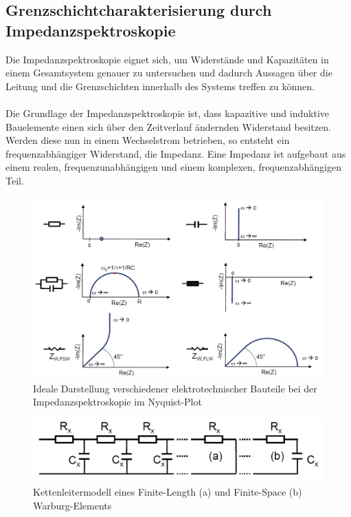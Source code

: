 \documentclass[a4paper, 11pt, headsepline,footsepline,twoside,abstract]{scrbook}
\begin{document}
\subsection{Grenzschichtcharakterisierung durch Impedanzspektroskopie}
Die Impedanzspektroskopie eignet sich, um Widerstände und Kapazitäten in einem Gesamtsystem genauer zu untersuchen und dadurch Aussagen über die Leitung und die Grenzschichten innerhalb des Systems treffen zu können.
\\\\
Die Grundlage der Impedanzspektroskopie ist, dass kapazitive und induktive Bauelemente einen sich über den Zeitverlauf ändernden Widerstand besitzen. Werden diese nun in einem Wechselstrom betrieben, so entsteht ein frequenzabhängiger Widerstand, die Impedanz. Eine Impedanz ist aufgebaut aus einem realen, frequenz\-unabhängigen und einem komplexen, frequenz\-abhängigen Teil.
\begin{figure}
	\centering
	\includegraphics[width=0.9\columnwidth]{images/is_bauteile.png}
	\caption{Ideale Darstellung verschiedener elektrotechnischer Bauteile bei der Impedanzspektroskopie im Nyquist-Plot \cite{bub_skript}}
	\label{bauteile_is}
\end{figure}
\begin{figure}[b]
	\centering
	\includegraphics[width=0.8\columnwidth]{images/warburg_element.png}
	\caption{Kettenleitermodell eines Finite-Length (a) und Finite-Space (b) Warburg-Elements \cite{bub_skript}}
	\label{warburg_element}
\end{figure}
\end{document}
